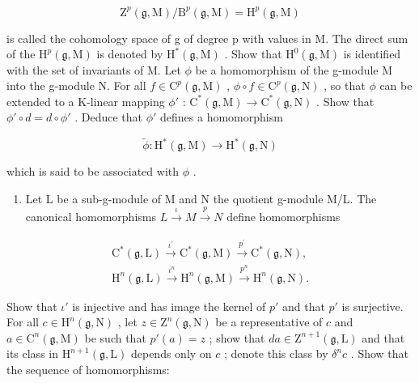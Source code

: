 \[
\mathrm{Z} ^ {p} (\mathfrak {g}, \mathrm{M}) / \mathrm{B} ^ {p} (\mathfrak {g}, \mathrm{M}) = \mathrm{H} ^ {p} (\mathfrak {g}, \mathrm{M})
\]

 is called the cohomology space of g of degree p with values in M. The direct sum of the \(\mathrm{H}^{p}(\mathfrak{g},\mathrm{M})\) is denoted by \(\mathrm{H}^{*}(\mathfrak{g},\mathrm{M})\) . Show that \(\mathrm{H}^{0}(\mathfrak{g},\mathrm{M})\) is identified with the set of invariants of M. Let \(\phi\) be a homomorphism of the g-module M into the g-module N. For all \(f \in \mathrm{C}^{p}(\mathfrak{g},\mathrm{M})\) , \(\phi \circ f \in \mathrm{C}^{p}(\mathfrak{g},\mathrm{N})\) , so that \(\phi\) can be extended to a K-linear mapping \(\phi'\) : \(\mathrm{C}^{*}(\mathfrak{g},\mathrm{M}) \to \mathrm{C}^{*}(\mathfrak{g},\mathrm{N})\) . Show that \(\phi' \circ d = d \circ \phi'\) . Deduce that \(\phi'\) defines a homomorphism

\[
\tilde {\phi} \colon \mathrm{H} ^ {*} (\mathfrak {g}, \mathrm{M}) \to \mathrm{H} ^ {*} (\mathfrak {g}, \mathrm{N})
\]

which is said to be associated with \(\phi\) .

\begin{enumerate}
\def\labelenumi{(\alph{enumi})}
\setcounter{enumi}{5}
\tightlist
\item
  Let L be a sub-g-module of M and N the quotient g-module M/L. The canonical homomorphisms \(L \stackrel{\iota}{\rightarrow} M \stackrel{p}{\rightarrow} N\) define homomorphisms
\end{enumerate}

\[
\begin{array}{l} \mathrm{C} ^ {*} (\mathfrak {g}, \mathrm{L}) \xrightarrow {\iota^ {\prime}} \mathrm{C} ^ {*} (\mathfrak {g}, \mathrm{M}) \xrightarrow {p ^ {\prime}} \mathrm{C} ^ {*} (\mathfrak {g}, \mathrm{N}), \\ \mathrm{H} ^ {n} (\mathfrak {g}, \mathrm{L}) \xrightarrow {\iota^ {n}} \mathrm{H} ^ {n} (\mathfrak {g}, \mathrm{M}) \xrightarrow {p ^ {n}} \mathrm{H} ^ {n} (\mathfrak {g}, \mathrm{N}). \end{array}
\]

Show that \(\iota'\) is injective and has image the kernel of \(p'\) and that \(p'\) is surjective. For all \(c \in \mathrm{H}^n(\mathfrak{g},\mathrm{N})\) , let \(z \in \mathrm{Z}^n(\mathfrak{g},\mathrm{N})\) be a representative of \(c\) and \(a \in \mathrm{C}^n(\mathfrak{g},\mathrm{M})\) be such that \(p'(a) = z\) ; show that \(da \in \mathrm{Z}^{n+1}(\mathfrak{g},\mathrm{L})\) and that its class in \(\mathrm{H}^{n+1}(\mathfrak{g},\mathrm{L})\) depends only on \(c\) ; denote this class by \(\delta^n c\) . Show that the sequence of homomorphisms:

